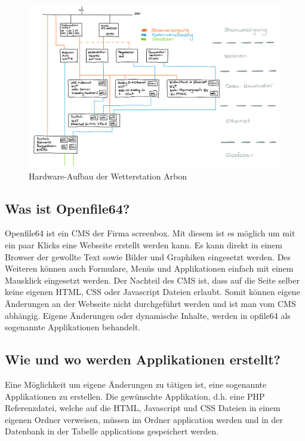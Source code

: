 \documentclass[a4paper,ngerman, 11pt]{report}
\begin{document}
\begin{figure}[htbp]
	\centering
	\includegraphics[width=1\linewidth]{img/HW-Aufbau}
	\caption{Hardware-Aufbau der Wetterstation Arbon}
	\label{img:HW-Aufbau}
\end{figure}

  
\subsection{Was ist Openfile64?}
Openfile64 ist ein CMS der Firma screenbox. Mit diesem ist es möglich um mit ein paar Klicks eine Webseite erstellt werden kann. Es kann direkt in einem Browser der gewollte Text sowie Bilder und Graphiken eingesetzt werden. Des Weiteren können auch Formulare, Menüs und Applikationen einfach mit einem Mausklick eingesetzt werden. Der Nachteil des CMS ist, dass auf die Seite selber keine eigenen HTML, CSS oder Javascript Dateien erlaubt. Somit können eigene Änderungen an der Webseite nicht durchgeführt werden und ist man vom CMS abhängig. Eigene Änderungen oder dynamische Inhalte, werden in opfile64 als sogenannte Applikationen behandelt.

\subsection{Wie und wo werden Applikationen erstellt?}
Eine Möglichkeit um eigene Änderungen zu tätigen ist, eine sogenannte Applikationen zu erstellen. Die gewünschte Applikation, d.h. eine PHP Referenzdatei, welche auf die HTML, Javascript und CSS Dateien in einem eigenen Ordner verweisen, müssen im Ordner application werden und in der Datenbank in der Tabelle applications gespeichert werden.
\end{document}
